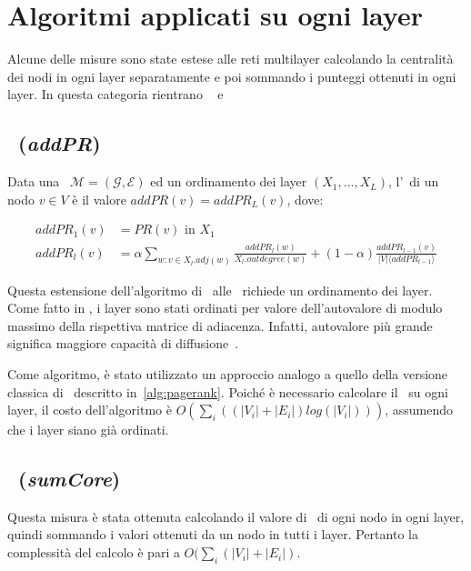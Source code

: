 \section{Algoritmi applicati su ogni layer}
Alcune delle misure sono state estese alle reti multilayer calcolando la centralità
dei nodi in ogni layer separatamente e poi sommando i punteggi ottenuti in ogni layer.
In questa categoria rientrano \addPageRank~\cite{halu:addpagerank} 
e \sumCore~\cite{basaras:infspmul}

\subsection{\addPageRank~(\textit{addPR})}
\begin{definizione}[\addPageRank]
    Data una \muln\ $\mathcal{M}=(\mathcal{G}, \mathcal{E})$ 
    ed un ordinamento dei layer $(X_1, \dots, X_{L})$, l'\addPageRank\
    di un nodo $v \in V$ è il valore 
    $addPR(v) = addPR_L(v)$, dove:

    \begin{equation}
        \begin{split}
addPR_1(v)&= PR(v) \text{ in } X_1 \\
addPR_l(v)&= \alpha \sum_{w : v \in X_l.adj(w)} 
            \frac{addPR_l(w)}{X_l.outdegree(w)} + 
            (1-\alpha)\frac{addPR_{l-1}(v)}{|V| \langle addPR_{l-1} \rangle}
        \end{split}
    \end{equation}

\end{definizione}

Questa estensione dell'algoritmo di \PageRank\ alle \muln\ richiede un ordinamento
dei layer. Come fatto in \cite{basaras:infspmul}, i layer sono stati ordinati per valore
dell'autovalore di modulo massimo della rispettiva matrice di adiacenza. Infatti, 
autovalore più grande significa maggiore capacità di diffusione~\cite{wang:eigenv}.

Come algoritmo, è stato utilizzato un approccio analogo a quello della versione classica di 
\PageRank\ descritto in~\vref{alg:pagerank}.
Poiché è necessario calcolare il \PageRank\ su ogni layer, il costo dell'algoritmo è 
$O(\sum_{i}((|V_i| + |E_i|)log(|V_i|)))$, assumendo che i layer siano già ordinati.

\subsection{\sumCore~(\textit{sumCore})}
Questa misura è stata ottenuta calcolando il valore di \kcore\ di ogni nodo in 
ogni layer, quindi sommando i valori ottenuti da un nodo in tutti i layer.
Pertanto la complessità del calcolo è pari a $O(\sum_{i}(|V_i| + |E_i|)$.

